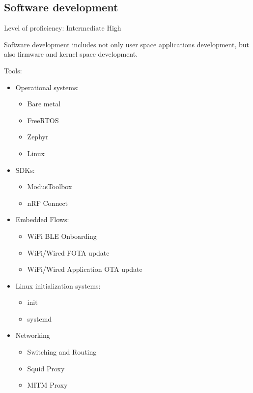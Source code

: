 \subsection{Software development}

Level of proficiency: Intermediate High

\vintent

Software development includes not only user space applications development,
but also firmware and kernel space development.

\vintent

Tools:
\begin{itemize}
    \item Operational systems:
    \begin{itemize}
        \item Bare metal
        \item FreeRTOS
        \item Zephyr
        \item Linux
    \end{itemize}

    \item SDKs:
    \begin{itemize}
        \item ModusToolbox
        \item nRF Connect
    \end{itemize}

    \item Embedded Flows:
    \begin{itemize}
        \item WiFi BLE Onboarding
        \item WiFi/Wired FOTA update
        \item WiFi/Wired Application OTA update
    \end{itemize}

    \item Linux initialization systems:
    \begin{itemize}
        \item init
        \item systemd
    \end{itemize}

    \item Networking
    \begin{itemize}
        \item Switching and Routing
        \item Squid Proxy
        \item MITM Proxy
    \end{itemize}


\end{itemize}
